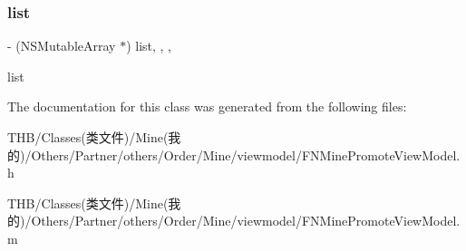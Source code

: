\subsubsection{\texorpdfstring{list}{list}}
{\footnotesize\ttfamily -\/ (N\+S\+Mutable\+Array $\ast$) list\hspace{0.3cm}{\ttfamily [read]}, {\ttfamily [write]}, {\ttfamily [nonatomic]}, {\ttfamily [strong]}}

list 

The documentation for this class was generated from the following files\+:\begin{DoxyCompactItemize}
\item 
T\+H\+B/\+Classes(类文件)/\+Mine(我的)/\+Others/\+Partner/others/\+Order/\+Mine/viewmodel/F\+N\+Mine\+Promote\+View\+Model.\+h\item 
T\+H\+B/\+Classes(类文件)/\+Mine(我的)/\+Others/\+Partner/others/\+Order/\+Mine/viewmodel/F\+N\+Mine\+Promote\+View\+Model.\+m\end{DoxyCompactItemize}
